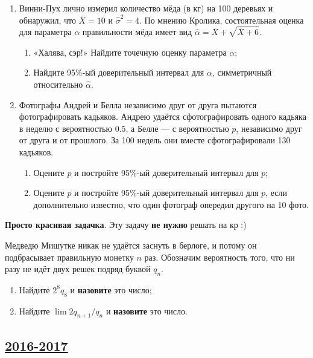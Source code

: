 \begin{enumerate}
\item Винни-Пух лично измерил количество мёда (в кг) на 100 деревьях и обнаружил, что $\bar X = 10$ и $\hat\sigma^2 = 4$.
По мнению Кролика, состоятельная оценка для параметра $\alpha$ правильности мёда имеет вид $\hat \alpha = \bar X + \sqrt{\bar X + 6}$.

\begin{enumerate}
\item «Халява, сэр!» Найдите точечную оценку параметра $\alpha$;
\item Найдите 95\%-ый доверительный интервал для $\alpha$, симметричный относительно
$\hat\alpha$.
\end{enumerate}

\item Фотографы Андрей и Белла независимо друг от друга пытаются фотографировать кадьяков.
Андрею удаётся сфотографировать одного кадьяка в неделю с вероятностью $0.5$, а Белле — с вероятностью $p$,
независимо друг от друга и от прошлого.
За 100 недель они вместе сфотографировали 130 кадьяков.

\begin{enumerate}
\item Оцените $p$ и постройте 95\%-ый доверительный интервал для $p$;
\item Оцените $p$ и постройте 95\%-ый доверительный интервал для $p$,
если дополнительно известно, что один фотограф опередил другого на 10 фото.
\end{enumerate}
\end{enumerate}

\textbf{Просто красивая задачка}. Эту задачу \textbf{не нужно} решать на кр :)

Медведю Мишутке никак не удаётся заснуть в берлоге, и потому он подбрасывает
правильную монетку $n$ раз.
Обозначим вероятность того, что ни разу не идёт двух решек подряд буквой $q_n$.

\begin{enumerate}[label=\asbuk*)]
\item Найдите $2^8q_8$ и \textbf{назовите} это число;
\item Найдите $\lim 2q_{n+1}/q_n$ и \textbf{назовите} это число.
\end{enumerate}


\newpage
\subsection[2016-2017]{\hyperref[sec:sol_kr_03_ip_2016_2017]{2016-2017}}
\label{sec:kr_03_ip_2016_2017}

